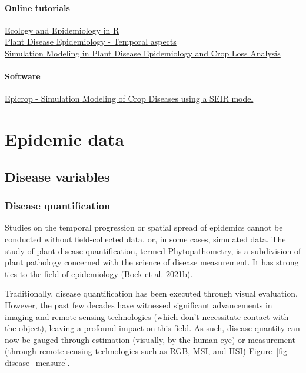 \documentclass[
  letterpaper,
]{book}
\begin{document}
\hypertarget{online-tutorials}{%
\subsection{Online tutorials}\label{online-tutorials}}

\href{https://www.apsnet.org/edcenter/disimpactmngmnt/topc/EcologyAndEpidemiologyInR/Pages/default.aspx}{Ecology
and Epidemiology in R}\\
\href{https://www.apsnet.org/edcenter/disimpactmngmnt/topc/EpidemiologyTemporal/Pages/default.aspx}{Plant
Disease Epidemiology - Temporal aspects}\\
\href{https://www.apsnet.org/edcenter/disimpactmngmnt/topc/BotanicalEpidemiology/Pages/default.aspx}{Simulation
Modeling in Plant Disease Epidemiology and Crop Loss Analysis}

\hypertarget{software}{%
\subsection{Software}\label{software}}

\href{http://adamhsparks.github.io/epicrop/}{Epicrop - Simulation
Modeling of Crop Diseases using a SEIR model}

\part{Epidemic data}

\hypertarget{disease-variables}{%
\chapter{Disease variables}\label{disease-variables}}

\hypertarget{disease-quantification}{%
\section{Disease quantification}\label{disease-quantification}}

Studies on the temporal progression or spatial spread of epidemics
cannot be conducted without field-collected data, or, in some cases,
simulated data. The study of plant disease quantification, termed
Phytopathometry, is a subdivision of plant pathology concerned with the
science of disease measurement. It has strong ties to the field of
epidemiology (Bock et al. 2021b).

Traditionally, disease quantification has been executed through visual
evaluation. However, the past few decades have witnessed significant
advancements in imaging and remote sensing technologies (which don't
necessitate contact with the object), leaving a profound impact on this
field. As such, disease quantity can now be gauged through estimation
(visually, by the human eye) or measurement (through remote sensing
technologies such as RGB, MSI, and HSI)
Figure~\ref{fig-disease_measure}.
\end{document}
